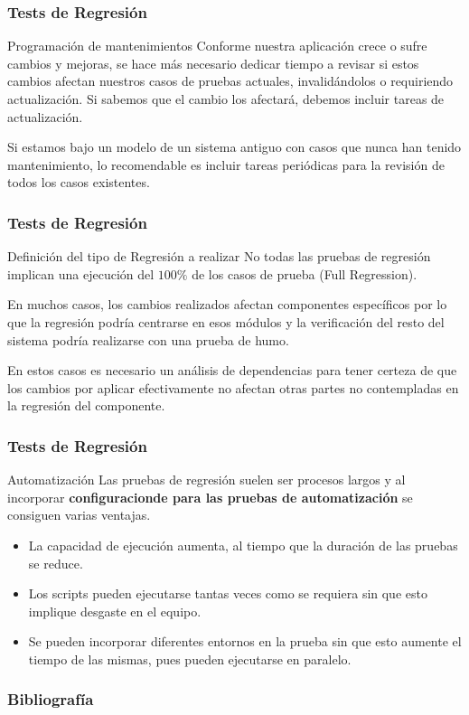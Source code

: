 \begin{frame}
    \frametitle{Tests de Regresión}
    \begin{block}{Programación de mantenimientos}
        Conforme nuestra aplicación crece o sufre cambios y mejoras, 
        se hace más necesario dedicar tiempo a revisar si estos 
        cambios afectan nuestros casos de pruebas actuales, invalidándolos o 
        requiriendo actualización. Si sabemos que el cambio los afectará,
        debemos incluir tareas de actualización.
         
        Si estamos bajo un modelo de un sistema antiguo con casos
        que nunca han tenido mantenimiento, lo recomendable es incluir 
        tareas periódicas para la revisión de todos los casos existentes.
    \end{block}
\end{frame}

\begin{frame}
    \frametitle{Tests de Regresión}
    \begin{block}{Definición del tipo de Regresión a realizar}
        No todas las pruebas de regresión implican una ejecución 
        del $100\%$ de los casos de prueba (Full Regression).
        
        En muchos casos, los cambios realizados afectan componentes 
        específicos por lo que la regresión podría centrarse en 
        esos módulos y la verificación del resto del sistema podría 
        realizarse con una prueba de humo.
        
        En estos casos es necesario un análisis de dependencias 
        para tener certeza de que los cambios por aplicar efectivamente 
        no afectan otras partes no contempladas en la regresión del 
        componente.
    \end{block}
\end{frame}

\begin{frame}
    \frametitle{Tests de Regresión}
    \begin{block}{Automatización}
        Las pruebas de regresión suelen ser procesos largos y 
        al incorporar \textbf{configuracionde para las pruebas de automatización}
        se consiguen varias ventajas.

        \begin{itemize}
            \item La capacidad de ejecución aumenta, al 
            tiempo que la duración de las pruebas se reduce.
            
            \item Los scripts pueden ejecutarse tantas veces como se 
            requiera sin que esto implique desgaste en el equipo.
            
            \item Se pueden incorporar diferentes entornos en
            la prueba sin que esto aumente el tiempo de las mismas, 
            pues pueden ejecutarse en paralelo.
        \end{itemize}
    \end{block}
\end{frame}

\begin{frame}
    \frametitle{Bibliografía}
   
    \nocite{wong1997study, yoo2012regression, leung1990study, leung1989insights}
   
    
    
  \end{frame}